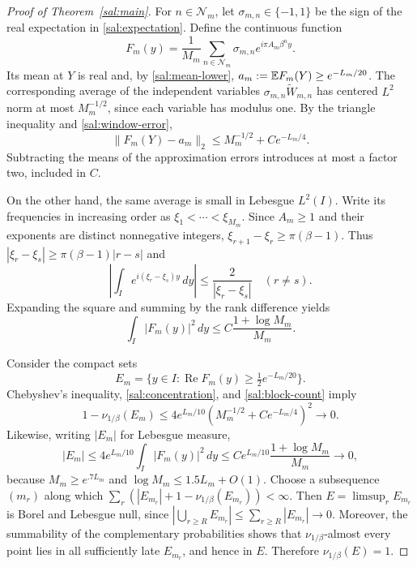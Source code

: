 \begin{proof}[Proof of Theorem~\ref{sal:main}]
For $n\in\mathcal N_m$, let $\sigma_{m,n}\in\{-1,1\}$ be the sign of
the real expectation in \eqref{sal:expectation}.  Define the continuous
function
\[
 F_m(y)=\frac1{M_m}\sum_{n\in\mathcal N_m}
                       \sigma_{m,n}e^{i\pi A_m\beta^ny}.
\]
Its mean at $Y$ is real and, by \eqref{sal:mean-lower},
$a_m:=\mathbb E F_m(Y)\ge e^{-L_m/20}$.
The corresponding average of the independent variables
$\sigma_{m,n}\widetilde W_{m,n}$ has centered $L^2$ norm at most
$M_m^{-1/2}$, since each variable has modulus one.
By the triangle inequality and \eqref{sal:window-error},
\begin{equation}\label{sal:concentration}
 \|F_m(Y)-a_m\|_2
       \le M_m^{-1/2}+Ce^{-L_m/4}.
\end{equation}
Subtracting the means of the approximation errors introduces at most
a factor two, included in $C$.

On the other hand, the same average is small in Lebesgue $L^2(I)$.
Write its frequencies in increasing order as
$\xi_1<\cdots<\xi_{M_m}$.  Since $A_m\ge1$ and their exponents are
distinct nonnegative integers,
$\xi_{r+1}-\xi_r\ge\pi(\beta-1)$.
Thus $|\xi_r-\xi_s|\ge\pi(\beta-1)|r-s|$ and
\[
 \left|\int_I e^{i(\xi_r-\xi_s)y}\,dy\right|
       \le\frac2{|\xi_r-\xi_s|}\quad(r\ne s).
\]
Expanding the square and summing by the rank difference yields
\begin{equation}\label{sal:lebesgue-average}
 \int_I|F_m(y)|^2\,dy
       \le C\frac{1+\log M_m}{M_m}.
\end{equation}

Consider the compact sets
\[
 E_m=\{y\in I:\operatorname{Re}F_m(y)\ge\tfrac12e^{-L_m/20}\}.
\]
Chebyshev's inequality, \eqref{sal:concentration}, and
\eqref{sal:block-count} imply
\[
 1-\nu_{1/\beta}(E_m)
 \le4e^{L_m/10}\left(M_m^{-1/2}+Ce^{-L_m/4}\right)^2
 \longrightarrow0.
\]
Likewise, writing $|E_m|$ for Lebesgue measure,
\[
 |E_m|\le4e^{L_m/10}\int_I|F_m(y)|^2\,dy
       \le C e^{L_m/10}\frac{1+\log M_m}{M_m}
       \longrightarrow0,
\]
because $M_m\ge e^{.7L_m}$ and $\log M_m\le1.5L_m+O(1)$.
Choose a subsequence $(m_r)$ along which
$\sum_r(|E_{m_r}|+1-\nu_{1/\beta}(E_{m_r}))<\infty$.
Then $E=\limsup_r E_{m_r}$ is Borel and Lebesgue null, since
$|\bigcup_{r\ge R}E_{m_r}|\le\sum_{r\ge R}|E_{m_r}|\to0$.
Moreover, the summability of the complementary probabilities shows
that $\nu_{1/\beta}$-almost every point lies in all sufficiently late
$E_{m_r}$, and hence in $E$.  Therefore $\nu_{1/\beta}(E)=1$.
\end{proof}

